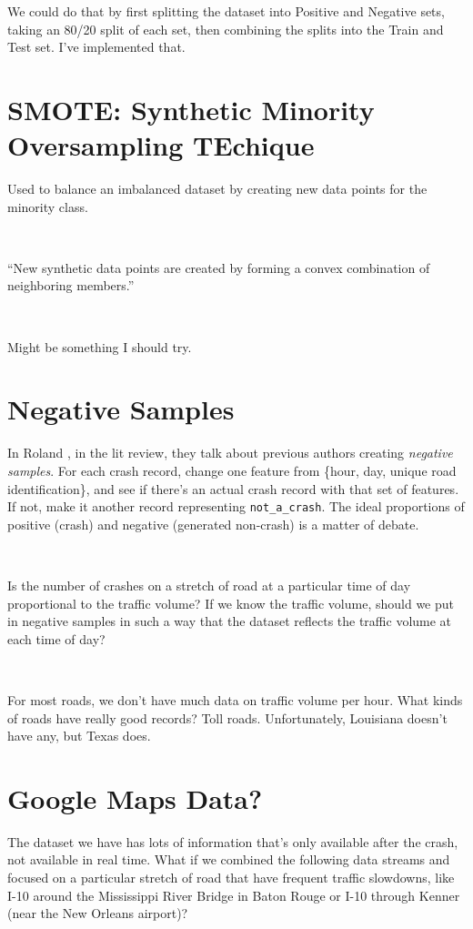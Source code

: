 \documentclass[11pt]{article}
\begin{document}
\begin{spacing}{1.2}
We could do that by first splitting the dataset into Positive and Negative sets, taking an 80/20 split of each set, then combining the splits into the Train and Test set.  I've implemented that.  

\section{SMOTE:  Synthetic Minority Oversampling TEchique}

Used to balance an imbalanced dataset by creating new data points for the minority class.  

\

``New synthetic data points are created by forming a convex combination of neighboring members.'' \cite{PARSA2019202}

\

Might be something I should try.  

\section{Negative Samples}

In Roland \cite{ ROLAND2021105860}, in the lit review, they talk about previous authors creating {\it negative samples}.  For each crash record, change one feature from \{hour, day, unique road identification\}, and see if there's an actual crash record with that set of features.  If not, make it another record representing \verb|not_a_crash|.  The ideal proportions of positive (crash) and negative (generated non-crash) is a matter of debate.  

\

Is the number of crashes on a stretch of road at a particular time of day proportional to the traffic volume?  If we know the traffic volume, should we put in negative samples in such a way that the dataset reflects the traffic volume at each time of day?

\

For most roads, we don't have much data on traffic volume per hour.  What kinds of roads have really good records?  Toll roads.  Unfortunately, Louisiana doesn't have any, but Texas does.  

\section{Google Maps Data?}

The dataset we have has lots of information that's only available after the crash, not available in real time.  What if we combined the following data streams and focused on a particular stretch of road that have frequent traffic slowdowns, like I-10 around the Mississippi River Bridge in Baton Rouge or I-10 through Kenner (near the New Orleans airport)?


\end{spacing}
\end{document}

